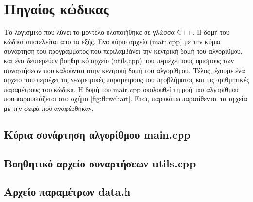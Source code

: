 \section{Πηγαίος κώδικας}

Το λογισμικό που λύνει το μοντέλο υλοποιήθηκε σε γλώσσα C++. Η δομή του κώδικα αποτελείται απο τα εξής. Ενα κύριο αρχείο (main.cpp) με την κύρια συνάρτηση του προγράμματος που περιλαμβάνει την κεντρική δομή του αλγορίθμου, και ένα δευτερεύον βοηθητικό αρχείο (utils.cpp) που περιέχει τους ορισμούς των συναρτήσεων που καλούνται στην κεντρική δομή του αλγορίθμου. Τέλος, έχουμε ένα αρχείο που περιέχει τις γεωμετρικές παραμέτρους του προβλήματος και τις αριθμητικές παραμέτρους του κώδικα. Η δομή του main.cpp ακολουθεί τη ροή του αλγορίθμου που παρουσιάζεται στο σχήμα \ref{fig:flowchart}.
Έτσι, παρακάτω παρατίθενται τα αρχεία με την σειρά που αναφέρθηκαν.

\subsection{Κύρια συνάρτηση αλγορίθμου main.cpp}

%

\vspace{4.5cm}
\subsection{Βοηθητικό αρχείο συναρτήσεων utils.cpp}

%

\vspace{3cm}
\subsection{Αρχείο παραμέτρων data.h}
%

